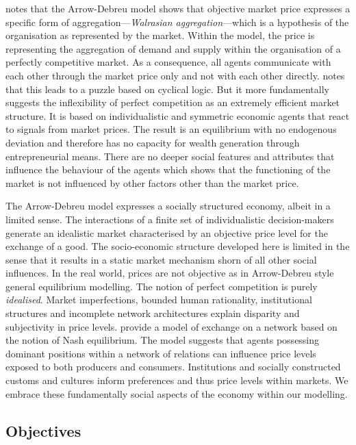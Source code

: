 \medskip\noindent \citet[p.~5]{Gilles1990} notes that the Arrow-Debreu model shows that objective market price expresses a specific form of aggregation---\emph{Walrasian aggregation}---which is a hypothesis of the organisation as represented by the market. Within the model, the price is representing the aggregation of demand and supply within the organisation of a perfectly competitive market. As a consequence, all agents communicate with each other through the market price only and not with each other directly. \citet{GillesDiamantaras2003} notes that this leads to a puzzle based on cyclical logic. But it more fundamentally suggests the inflexibility of perfect competition as an extremely efficient market structure. It is based on individualistic and symmetric economic agents that react to signals from market prices. The result is an equilibrium with no endogenous deviation and therefore has no capacity for wealth generation through entrepreneurial means. There are no deeper social features and attributes that influence the behaviour of the agents which shows that the functioning of the market is not influenced by other factors other than the market price.

The Arrow-Debreu model expresses a socially structured economy, albeit in a limited sense. The interactions of a finite set of individualistic decision-makers generate an idealistic market characterised by an objective price level for the exchange of a good. The socio-economic structure developed here is limited in the sense that it results in a static market mechanism shorn of all other social influences. In the real world, prices are not objective as in Arrow-Debreu style general equilibrium modelling. The notion of perfect competition is purely \emph{idealised}. Market imperfections, bounded human rationality, institutional structures and incomplete network architectures explain disparity and subjectivity in price levels. \citet{Blume2009} provide a model of exchange on a network based on the notion of Nash equilibrium. The model suggests that agents possessing dominant positions within a network of relations can influence price levels exposed to both producers and consumers. Institutions and socially constructed customs and cultures inform preferences and thus price levels within markets. We embrace these fundamentally social aspects of the economy within our modelling.

\subsection{Objectives}

